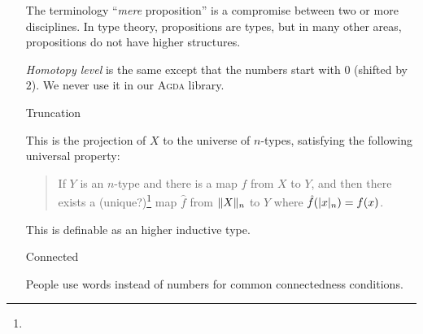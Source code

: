 \documentclass{article}
\begin{document}
\begin{itemize}
    The terminology ``\emph{mere} proposition'' is a compromise between two or more
    disciplines.  In type theory, propositions are types, but in many other areas,
    propositions do not have higher structures.

    \emph{Homotopy level} is the same except that the numbers start with $0$ (shifted by $2$).
    We never use it in our \textsc{Agda} library.

  \item[Truncation]



    This is the projection of $X$ to the universe of $n$-types,
    satisfying the following universal property:

    \begin{quote}
      If $Y$ is an $n$-type and there is a map $f$ from $X$ to $Y$,
      and then there exists a (unique?)\footnote{} map $\hat f$
      from $\trunc{n}{X}$ to $Y$ where $\hat f(\proj{n}{x}) = f(x)$.
    \end{quote}

    This is definable as an higher inductive type.

  \item[Connected]




    People use words instead of numbers for common connectedness conditions.
\end{itemize}
\end{document}
